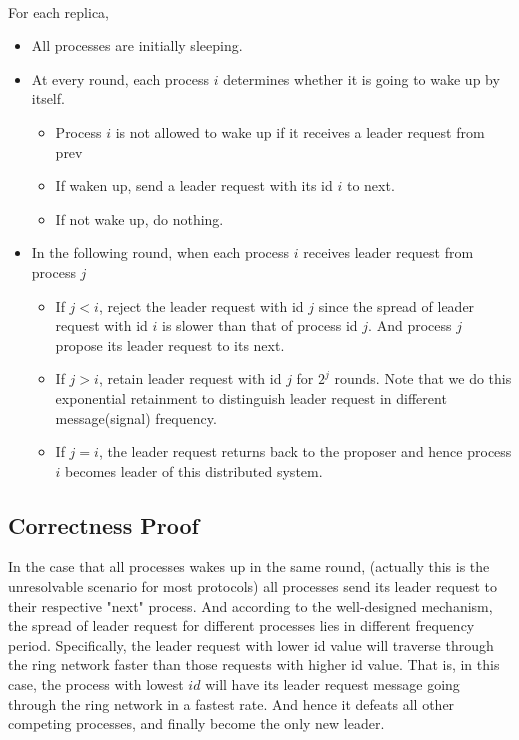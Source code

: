 \documentclass[11pt,a4paper]{article}
\begin{document}
\noindent \\
For each replica, 

\begin{itemize}
    \item{All processes are initially sleeping. }
    \item{At every round, each process $i$ determines whether it is going to wake up by itself.}
        \begin{itemize}
        \item{Process $i$ is not allowed to wake up if it receives a leader
                request from prev}
        \item{If waken up, send a leader request with its id $i$ to next.}
        \item{If not wake up, do nothing.}
        \end{itemize}
    \item{In the following round, when each process $i$ receives leader
            request from process $j$}
        \begin{itemize}
            \item{If $j < i$, reject the leader request with id $j$ since the
                    spread of leader request with id $i$ is slower than that of
                    process id $j$. And process $j$ propose its leader request
                to its next.}
            \item{If $j > i$, retain leader request with id $j$ for $2^j$
                    rounds. Note that we do this exponential retainment to
                    distinguish leader request in different message(signal) frequency.}
            \item{If $j = i$, the leader request returns back to the proposer
                    and hence process $i$ becomes leader of this distributed
                    system.}
        \end{itemize}

\end{itemize}


\subsection{Correctness Proof}
In the case that all processes wakes up in the same round, (actually this is
the unresolvable scenario for most protocols) all processes send its leader
request to their respective "next" process. And according to the well-designed
mechanism, the spread of leader request for different processes lies in
different frequency period. Specifically, the leader request with lower id
value will traverse through the ring network faster than those requests with
higher id value. That is, in this case, the process with lowest $id$ will
have its leader request message going through the ring network in a fastest
rate. And hence it defeats all other competing processes, and finally become
the only new leader. 
\end{document}
